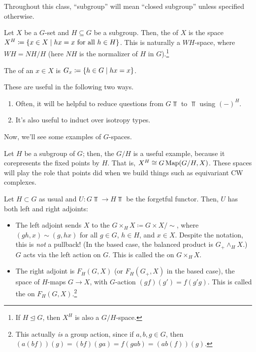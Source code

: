 Throughout this class, ``subgroup'' will mean ``closed subgroup'' unless specified otherwise.
\begin{defn}
Let $X$ be a $G$-set and $H\subseteq G$ be a subgroup. Then, the  of $X$ is the space
$X^H\coloneqq \{x\in X\mid hx = x\text{ for all } h\in H\}$. This is naturally a $WH$-space, where $WH = NH/H$
(here $NH$ is the normalizer of $H$ in $G$).\footnote{If $H\trianglelefteq G$, then $X^H$ is also a
$G/H$-space.}
\end{defn}
\begin{defn}
The  of an $x\in X$ is $G_x\coloneqq \{h\in G\mid hx = x\}$.
\end{defn}
These are useful in the following two ways.
\begin{enumerate}
	\item Often, it will be helpful to reduce questions from $G\Top$ to $\Top$ using $(-)^H$.
	\item It's also useful to induct over isotropy types.
\end{enumerate}
Now, we'll see some examples of $G$-spaces.
\begin{exm}
Let $H$ be a subgroup of $G$; then, the  $G/H$ is a useful example, because it corepresents the
fixed points by $H$. That is, $X^H \cong G\operatorname{Map}(G/H, X)$. These spaces will play the role that points did when we
build things such as equivariant CW complexes.
\end{exm}
\begin{exm}
Let $H\subset G$ as usual and $U\colon G\Top\to H\Top$ be the forgetful functor. Then, $U$ has both left and right
adjoints:
\begin{itemize}
	\item The left adjoint sends $X$ to the  $G\times_H X\coloneqq G\times X/\sim$, where
	$(gh, x)\sim (g, hx)$ for all $g\in G$, $h\in H$, and $x\in X$. Despite the notation, this is \emph{not} a
	pullback! (In the based case, the balanced product is $G_+\wedge_H X$.) $G$ acts via the left action on $G$.
	This is called the  on $G\times_H X$.
	\item The right adjoint is $F_H(G,X)$ (or $F_H(G_+, X)$ in the based case), the space of $H$-maps $G\to X$,
	with $G$-action $(gf)(g') = f(g'g)$. This is called the  on
	$F_H(G,X)$.\footnote{This actually \emph{is} a group action, since if $a,b,g\in G$, then $(a(b f))(g) =
	(bf)(ga) = f(gab) = (ab(f))(g)$.} \qedhere
\end{itemize}
\end{exm}

